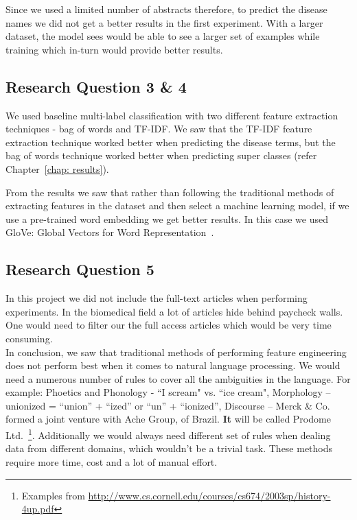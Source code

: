 Since we used a limited number of abstracts therefore, to predict the disease names we did not get a better results in the first experiment. With a larger dataset, the model sees would be able to see a larger set of examples while training which in-turn would provide better results.

\subsection{Research Question 3 \& 4}
We used baseline multi-label classification with two different feature extraction techniques - bag of words and TF-IDF. We saw that the TF-IDF feature extraction technique worked better when predicting the disease terms, but the bag of words technique worked better when predicting super classes (refer Chapter~\ref{chap: results}). 

From the results we saw that rather than following the traditional methods of extracting features in the dataset and then select a machine learning model, if we use a pre-trained word embedding we get better results. In this case we used GloVe: Global Vectors for Word Representation~\cite{pennington2014glove}. 

\subsection{Research Question 5}
In this project we did not include the full-text articles when performing experiments. In the biomedical field a lot of articles hide behind paycheck walls. One would need to filter our the full access articles which would be very time consuming.  
\\

In conclusion, we saw that traditional methods of performing feature engineering does not perform best when it comes to natural language processing. We would need a numerous number of rules to cover all the ambiguities in the language. For example: Phoetics and Phonology - ``I scream" vs. ``ice cream", Morphology -- unionized = ``union” + ``ized” or ``un” + ``ionized”, Discourse -- Merck \& Co. formed a joint venture with Ache Group, of Brazil. \textbf{It}
will be called Prodome Ltd.~\footnote{Examples from \url{http://www.cs.cornell.edu/courses/cs674/2003sp/history-4up.pdf}}. 
Additionally we would always need different set of rules when dealing data from different domains, which wouldn't be a trivial task. These methods require more time, cost and a lot of manual effort. 

